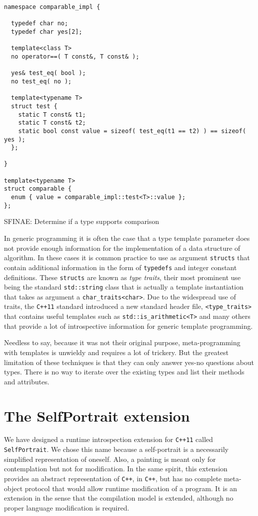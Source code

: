 \begin{listing}[H]
\begin{verbatim}
namespace comparable_impl {

  typedef char no;
  typedef char yes[2];

  template<class T>
  no operator==( T const&, T const& );

  yes& test_eq( bool );
  no test_eq( no );

  template<typename T>
  struct test {
    static T const& t1;
    static T const& t2;
    static bool const value = sizeof( test_eq(t1 == t2) ) == sizeof( yes );
  };

}

template<typename T>
struct comparable {
  enum { value = comparable_impl::test<T>::value };
};
\end{verbatim}
\caption{SFINAE: Determine if a type supports comparison}
\label{lst:sfinae}
\end{listing}

In generic programming it is often the case that a type template parameter does not provide enough information for
the implementation of a data structure of algorithm. In these cases it is common practice to use as argument \texttt{structs}
that contain additional information in the form of \texttt{typedefs} and integer constant definitions. These \texttt{structs}
are known as \emph{type traits}, their most prominent use being the standard \texttt{std::string} class that is actually
a template instantiation that takes as argument a \texttt{char\_traits<char>}. Due to the widespread use of traits, the \texttt{C++11}
standard introduced a new standard header file, \texttt{<type\_traits>} that contains useful templates such as
\verb|std::is_arithmetic<T>| and many others that provide a lot of introspective information for generic template programming.

Needless to say, because it was not their original purpose, meta-programming with templates is unwieldy and requires
a lot of trickery. But the greatest limitation of these techniques is that they can only answer yes-no questions about types.
There is no way to iterate over the existing types and list their methods and attributes. 

\section{The SelfPortrait extension}

We have designed a runtime introspection extension for \texttt{C++11} called \texttt{SelfPortrait}. We chose this name because a self-portrait
is a necessarily simplified representation of oneself. Also, a painting is meant only for contemplation but not for modification. In
the same spirit, this extension provides an abstract representation of \texttt{C++}, in \texttt{C++}, but has no complete meta-object protocol that would
allow runtime modification of a program. It is an extension in the sense that the compilation model is extended, although no proper
language modification is required.

